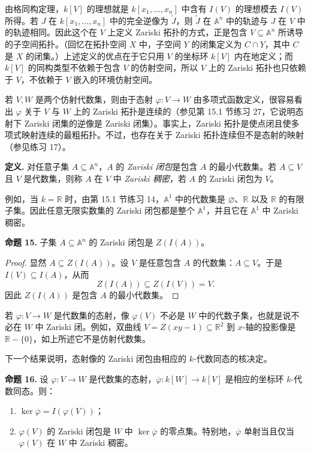 由格同构定理，$k[V]$ 的理想就是 $k[x_1,\ldots,x_n]$ 中含有 $I(V)$ 的理想模去 $I(V)$ 所得。若 $J$ 在 $k[x_1,\ldots,x_n]$ 中的完全逆像为 $\widetilde J$，则 $\widetilde J$ 在 $\mathbb A^n$ 中的轨迹与 $J$ 在 $V$ 中的轨迹相同。因此这个在 $V$ 上定义 Zariski 拓扑的方式，正是包含 $V\subseteq\mathbb A^n$ 所诱导的子空间拓扑。（回忆在拓扑空间 $X$ 中，子空间 $Y$ 的闭集定义为 $C\cap Y$，其中 $C$ 是 $X$ 的闭集。）上述定义的优点在于它只用 $V$ 的坐标环 $k[V]$ 内在地定义；而 $k[V]$ 的同构类型不依赖于包含 $V$ 的仿射空间，所以 $V$ 上的 Zariski 拓扑也只依赖于 $V$，不依赖于 $V$ 嵌入的环境仿射空间。

若 $V,W$ 是两个仿射代数集，则由于态射 $\varphi:V\to W$ 由多项式函数定义，很容易看出 $\varphi$ 关于 $V$ 与 $W$ 上的 Zariski 拓扑是连续的（参见第 15.1 节练习 27，它说明态射下 Zariski 闭集的逆像是 Zariski 闭集）。事实上，Zariski 拓扑是使点闭且使多项式映射连续的最粗拓扑。不过，也存在关于 Zariski 拓扑连续但不是态射的映射（参见练习 17）。

\noindent\textbf{定义.} 对任意子集 $A\subseteq\mathbb A^n$，$A$ 的 \emph{Zariski 闭包}是包含 $A$ 的最小代数集。若 $A\subseteq V$ 且 $V$ 是代数集，则称 $A$ 在 $V$ 中 \emph{Zariski 稠密}，若 $A$ 的 Zariski 闭包为 $V$。

例如，当 $k=\mathbb R$ 时，由第 15.1 节练习 14，$\mathbb A^1$ 中的代数集是 $\varnothing$、$\mathbb R$ 以及 $\mathbb R$ 的有限子集。因此任意无限实数集的 Zariski 闭包都是整个 $\mathbb A^1$，并且它在 $\mathbb A^1$ 中 Zariski 稠密。

\noindent\textbf{命题 15.} 子集 $A\subseteq\mathbb A^n$ 的 Zariski 闭包是 $Z(I(A))$。

\begin{proof}
	显然 $A\subseteq Z(I(A))$。设 $V$ 是任意包含 $A$ 的代数集：$A\subseteq V$。于是 $I(V)\subseteq I(A)$，从而
	\[
	Z(I(A))\subseteq Z(I(V))=V.
	\]
	因此 $Z(I(A))$ 是包含 $A$ 的最小代数集。
\end{proof}

若 $\varphi:V\to W$ 是代数集的态射，像 $\varphi(V)$ 不必是 $W$ 中的代数子集，也就是说不必在 $W$ 中 Zariski 闭。例如，双曲线 $V=Z(xy-1)\subseteq\mathbb R^2$ 到 $x$-轴的投影像是 $\mathbb R-\{0\}$，如上所述它不是仿射代数集。

下一个结果说明，态射像的 Zariski 闭包由相应的 $k$-代数同态的核决定。

\noindent\textbf{命题 16.} 设 $\varphi:V\to W$ 是代数集的态射，$\overline\varphi:k[W]\to k[V]$ 是相应的坐标环 $k$-代数同态。则：
\begin{enumerate}[label=(\arabic*)]
	\item $\ker\overline\varphi=I(\varphi(V))$；
	\item $\varphi(V)$ 的 Zariski 闭包是 $W$ 中 $\ker\overline\varphi$ 的零点集。特别地，$\overline\varphi$ 单射当且仅当 $\varphi(V)$ 在 $W$ 中 Zariski 稠密。
\end{enumerate}

